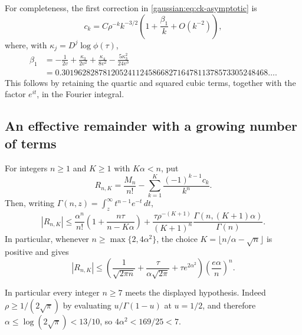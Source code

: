 For completeness, the first correction in \eqref{gaussian:eq:ck-asymptotic} is
\[
 c_k=C\rho^{-k}k^{-3/2}\left(1+\frac{\beta_1}{k}+O(k^{-2})\right),
\]
where, with $\kappa_j=D^j\log\phi(\tau)$,
\begin{align*}
 \beta_1&=-\frac1{2v}+\frac{\kappa_3}{2v^2}
 +\frac{\kappa_4}{8v^2}-\frac{5\kappa_3^2}{24v^3}
 \\
 &=0.30196282878120524112458668271647811378573305248468\ldots.
\end{align*}
This follows by retaining the quartic and squared cubic terms, together
with the factor $e^{it}$, in the Fourier integral.

\subsection{An effective remainder with a growing number of terms}
\begin{theorem}
\label{gaussian:thm:effective-moment}
For integers $n\ge1$ and $K\ge1$ with $K\alpha<n$, put
\[
 R_{n,K}=\frac{M_n}{n!}-\sum_{k=1}^{K}\frac{(-1)^{k-1}c_k}{k^n}.
\]
Then, writing $\Gamma(n,z)=\int_z^\infty t^{n-1}e^{-t}\,dt$,
\begin{equation}
 |R_{n,K}|\le
 \frac{\alpha^n}{n!}\left(1+\frac{n\tau}{n-K\alpha}\right)
 +\frac{\tau\rho^{-(K+1)}}{(K+1)^n}
   \frac{\Gamma(n,(K+1)\alpha)}{\Gamma(n)}.
 \label{gaussian:eq:remainder-exact}
\end{equation}
In particular, whenever $n\ge\max\{2,4\alpha^2\}$, the choice
$K=\lfloor n/\alpha-\sqrt n\rfloor$ is positive and gives
\begin{equation}
 |R_{n,K}|\le
 \left(\frac1{\sqrt{2\pi n}}+
       \frac{\tau}{\alpha\sqrt{2\pi}}+
       \tau e^{2\alpha^2}\right)
 \left(\frac{e\alpha}{n}\right)^n.
 \label{gaussian:eq:remainder-optimized}
\end{equation}
\end{theorem}
In particular every integer $n\ge7$ meets the displayed hypothesis.
Indeed $\rho\ge1/(2\sqrt\pi)$ by evaluating $u/\Gamma(1-u)$
at $u=1/2$, and therefore $\alpha\le\log(2\sqrt\pi)<13/10$,
so $4\alpha^2<169/25<7$.

